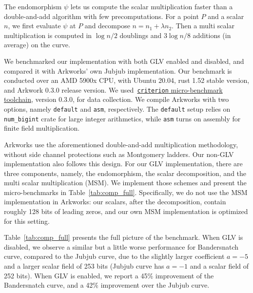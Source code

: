 \documentclass[version=preprint]{iacrcc}
\begin{document}
The endomorphism $\psi$ lets us compute the scalar multiplication
faster than a double-and-add algorithm with few precomputations. For a
point $P$ and a scalar $n$, we first evaluate $\psi$ at $P$ and
decompose $n = n_1 + \lambda n_2$. Then a multi scalar multiplication
is computed in $\log n/2$ doublings and $3\log n/8$ additions (in average) on the curve.

We benchmarked our implementation with both GLV enabled and disabled, and 
compared it with Arkworks' own Jubjub implementation. 
Our benchmark is conducted over an AMD 5900x CPU, with Ubuntu 20.04,
rust 1.52 stable version, and Arkwork 0.3.0 release version.
We used~\href{https://docs.rs/criterion}{\texttt{criterion}
  micro-benchmark toolchain},  version 0.3.0, for data collection. We
compile Arkworks with two options, namely \texttt{default} and
\texttt{asm}, respectively.
The \texttt{default} setup relies on \texttt{num\_bigint} crate for
large integer arithmetics, while \texttt{asm} turns on assembly for
finite field multiplication. 

Arkworks use the aforementioned double-and-add
multiplication methodology, without side channel protections such 
as Montgomery ladders. Our non-GLV implementation also follows
this design. For our GLV implementation, there are three components,
namely, the endomorphism, the scalar decomposition, and the
multi scalar multiplication (MSM). We implement those schemes and 
present the micro-benchmarks in Table~\ref{tab:comp_full}.
Specifically, we do not use the MSM implementation in Arkworks:
our scalars, after the decomposition, contain roughly 128 bits
of leading zeros, and our own MSM implementation is 
optimized for this setting.

Table~\ref{tab:comp_full} presents the full picture of the benchmark.
When GLV is disabled, we observe a similar but a little worse 
performance for Bandersnatch curve, compared to
the Jubjub curve, due to the slightly larger coefficient 
$a=-5$ and a larger scalar field of 253 bits (Jubjub curve has $a=-1$
and a scalar field of 252 bits).
When GLV is enabled, we report a 45\% improvement of the Bandersnatch
curve, and a 42\% improvement over the Jubjub curve.
\end{document}

